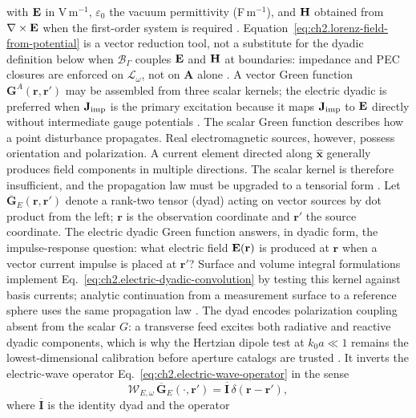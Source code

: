with \(\mathbf{E}\) in V\,m\(^{-1}\), \(\varepsilon_0\) the vacuum permittivity (F\,m\(^{-1}\)),
and \(\mathbf{H}\) obtained from \(\nabla\times\mathbf{E}\) when the first-order system is required
\cite{harrington2001}. Equation~\eqref{eq:ch2.lorenz-field-from-potential}
is a vector reduction tool, not a substitute for the dyadic definition below when
\(\mathcal{B}_\Gamma\) couples \(\mathbf{E}\) and \(\mathbf{H}\) at boundaries: impedance and PEC
closures are enforced on \(\mathcal{L}_\omega\), not on \(\mathbf{A}\) alone
\cite{stratton1941}. A vector Green function \(\mathbf{G}^{A}(\mathbf{r},\mathbf{r}')\)
may be assembled from three scalar kernels; the electric dyadic is preferred when
\(\mathbf{J}_{\mathrm{imp}}\) is the primary excitation because it maps \(\mathbf{J}_{\mathrm{imp}}\) to \(\mathbf{E}\) directly
without intermediate gauge potentials \cite{harrington2001}.
The scalar Green function describes how a point disturbance propagates. Real electromagnetic
sources, however, possess orientation and polarization. A current element directed along
$\hat{\mathbf{x}}$ generally produces field components in multiple directions. The scalar
kernel is therefore insufficient, and the propagation law must be upgraded to a tensorial
form \cite{stratton1941}. Let \(\overline{\mathbf{G}}_{E}(\mathbf{r},\mathbf{r}')\) denote a rank-two tensor
(dyad) acting on vector sources by dot product from the left; $\mathbf{r}$ is the
observation coordinate and $\mathbf{r}'$ the source coordinate.
The electric dyadic Green function answers, in dyadic form, the impulse-response
question: what electric field \(\mathbf{E}(\mathbf{r})\) is produced at \(\mathbf{r}\) when a
vector current impulse is placed at \(\mathbf{r}'\)?
Surface and volume integral formulations implement Eq.~\eqref{eq:ch2.electric-dyadic-convolution}
by testing this kernel against basis currents; analytic continuation from a measurement
surface to a reference sphere uses the same propagation law
\cite{harrington2001}. The dyad encodes polarization
coupling absent from the scalar $G$: a transverse feed excites both radiative and reactive
dyadic components, which is why the Hertzian dipole test at $k_0 a\ll 1$ remains the
lowest-dimensional calibration before aperture catalogs are trusted \cite{jackson1999}.
It inverts the electric-wave operator
Eq.~\eqref{eq:ch2.electric-wave-operator} in the sense
\begin{equation}
\label{eq:ch2.dyadic-green-defining-operator}
\mathcal{W}_{E,\omega}\,
\overline{\mathbf{G}}_{E}(\cdot,\mathbf{r}')
=
\overline{\mathbf{I}}\,\delta(\mathbf{r}-\mathbf{r}'),
\end{equation}
where \(\overline{\mathbf{I}}\) is the identity dyad and the operator
